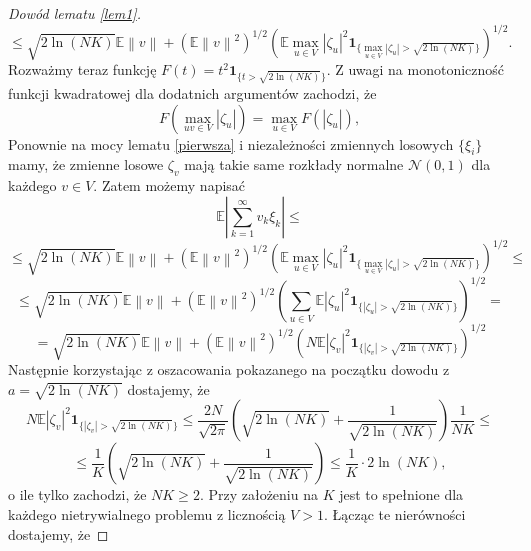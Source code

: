 \documentclass{mwart}
\newcommand{\norm}[1]{\left\lVert#1\right\rVert}
\begin{document}
\begin{proof} [Dowód lematu \ref{lem1}]
\begin{displaymath}
\end{displaymath}
\begin{displaymath}
\leq \sqrt{2\ln (NK)}\mathbb{E}\norm{v}+\left(\mathbb{E}\norm{v}^2\right)^{1/2}\left(\mathbb{E}\max_{u\in V}|\zeta_u|^2\pmb{1}_{\{\max_{u\in V}|\zeta_u|> \sqrt{2\ln (NK)}\}}\right)^{1/2}.
\end{displaymath}
Rozważmy teraz funkcję $F(t)=t^2\pmb{1}_{\{t> \sqrt{2\ln (NK)}\}}$. Z uwagi na monotoniczność funkcji kwadratowej dla dodatnich argumentów zachodzi, że
\begin{displaymath}
F(\max_{uv\in V}|\zeta_u|)= \max_{u\in V}F(|\zeta_u|),
\end{displaymath}
Ponownie na mocy lematu \ref{pierwsza} i niezależności zmiennych losowych $\{\xi_i\}$ mamy, że zmienne losowe $\zeta_v$ mają takie same rozkłady normalne $\mathcal{N}(0,1)$ dla każdego $v\in V$. Zatem możemy napisać
\begin{displaymath}
\mathbb{E}\left|\sum_{k=1}^{\infty}v_k\xi_k\right|\leq
\end{displaymath}
\begin{displaymath}
\leq \sqrt{2\ln (NK)}\mathbb{E}\norm{v}+\left(\mathbb{E}\norm{v}^2\right)^{1/2}\left(\mathbb{E}\max_{u\in V}|\zeta_u|^2\pmb{1}_{\{\max_{u\in V}|\zeta_u|> \sqrt{2\ln (NK)}\}}\right)^{1/2}\leq
\end{displaymath}
\begin{displaymath}
\leq \sqrt{2\ln (NK)}\mathbb{E}\norm{v}+\left(\mathbb{E}\norm{v}^2\right)^{1/2}\left(\sum_{u\in V}\mathbb{E}|\zeta_u|^2\pmb{1}_{\{|\zeta_u|> \sqrt{2\ln (NK)}\}}\right)^{1/2}=
\end{displaymath}
\begin{displaymath}
=\sqrt{2\ln (NK)}\mathbb{E}\norm{v}+\left(\mathbb{E}\norm{v}^2\right)^{1/2}\left(N\mathbb{E}|\zeta_v|^2\pmb{1}_{\{|\zeta_v|> \sqrt{2\ln (NK)}\}}\right)^{1/2}
\end{displaymath}
Następnie korzystając z oszacowania pokazanego na początku dowodu z $a=\sqrt{2\ln (NK)}$ dostajemy, że
\begin{displaymath}
N\mathbb{E}|\zeta_v|^2\pmb{1}_{\{|\zeta_v|> \sqrt{2\ln (NK)}\}}\leq \frac{2N}{\sqrt{2\pi}}\left(\sqrt{2\ln (NK)}+\frac{1}{\sqrt{2\ln (NK)}}\right)\frac{1}{NK}\leq
\end{displaymath}
\begin{displaymath}
\leq  \frac{1}{K}\left(\sqrt{2\ln (NK)}+\frac{1}{\sqrt{2\ln (NK)}}\right)\leq  \frac{1}{K}\cdot 2\ln (NK),
\end{displaymath}
o ile tylko zachodzi, że $NK\geq 2$. Przy założeniu na $K$ jest to spełnione dla każdego nietrywialnego problemu z licznością $V>1$. Łącząc te nierówności dostajemy, że

\end{proof}
\end{document}
